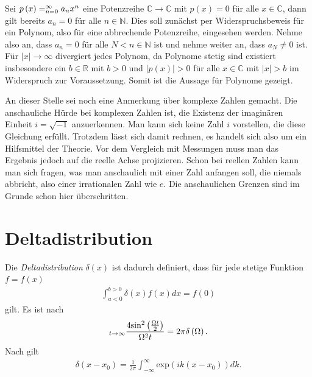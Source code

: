 \documentclass{book}
\renewcommand{\exp}{\text{exp}}
\renewcommand{\sin}{\text{sin}}
\let\lim\relax
\DeclareMathOperator*{\lim}{\text{lim}}
\let\sum\relax
\DeclareMathOperator*{\sum}{\raisebox{-3.5pt}{\scalebox{2}{\rotatebox{1}{{\bask Σ}}}}}
\begin{document}
%
Sei $p\left(x\right) = \sum_{n = 0}^{\infty}a_nx^n$ eine Potenzreihe $\mathbb{C}\to\mathbb{C}$ mit $p\left(x\right) = 0$ für alle $x\in\mathbb{C}$, dann gilt bereits $a_n = 0$ für alle $n\in\mathbb{N}$. Dies soll zunächst per Widerspruchsbeweis für ein Polynom, also für eine abbrechende Potenzreihe, eingesehen werden. Nehme also an, dass $a_n = 0$ für alle $N < n \in \mathbb{N}$ ist und nehme weiter an, dass $a_N \not = 0$ ist. Für $\left|x\right|\to\infty$ divergiert jedes Polynom, da Polynome stetig sind existiert insbesondere ein $b \in \mathbb{R}$ mit $b > 0$ und $\left|p\left(x\right)\right| > 0$ für alle $x \in \mathbb{C}$ mit $\left|x\right| > b$ im Widerspruch zur Voraussetzung. Somit ist die Aussage für Polynome gezeigt.

An dieser Stelle sei noch eine Anmerkung über komplexe Zahlen gemacht. Die anschauliche Hürde bei komplexen Zahlen ist, die Existenz der imaginären Einheit $i =\sqrt{-1}$ anzuerkennen. Man kann sich keine Zahl $i$ vorstellen, die diese Gleichung erfüllt. Trotzdem lässt sich damit rechnen, es handelt sich also um ein Hilfsmittel der Theorie. Vor dem Vergleich mit Messungen muss man das Ergebnis jedoch auf die reelle Achse projizieren. Schon bei reellen Zahlen kann man sich fragen, was man anschaulich mit einer Zahl anfangen soll, die niemals abbricht, also einer irrationalen Zahl wie $e$. Die anschaulichen Grenzen sind im Grunde schon hier überschritten.

\section{Deltadistribution}
\label{sec:Deltadistribution}

Die \textit{Deltadistribution} $\delta\left(x\right)$ ist dadurch definiert, dass für jede stetige Funktion $f = f\left(x\right)$
%
\begin{eqnarray}
\int_{a<0}^{b>0}\delta\left(x\right)f\left(x\right)dx = f\left(0\right)
\end{eqnarray}
%
gilt. Es ist nach \cite{fliessbach_theo_3}
%
\begin{eqnarray}
\lim_{t\to \infty}\frac{4\sin^2\left(\frac{\Omega t}{2}\right)}{\Omega ^2t} = 2\pi\delta\left(\Omega\right)\label{eq:delta_distribution_prop_1}.
\end{eqnarray}
%
Nach \cite{fliessbach_theo_2} gilt
%
\begin{eqnarray}
\delta\left(x - x_0\right) = \frac{1}{2\pi}\int_{-\infty}^{\infty}\exp\left(ik\left(x - x_0\right)\right)dk\label{eq:delta_distribution_prop_2}.
\end{eqnarray}
%
\end{document}
